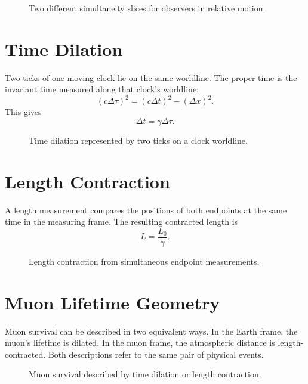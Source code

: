 \begin{figure}[h!]
  \centering
  
  \caption{Two different simultaneity slices for observers in relative motion.}
\end{figure}

\clearpage

\section{Time Dilation}

Two ticks of one moving clock lie on the same worldline.  The proper time is the
invariant time measured along that clock's worldline:
\[
(c\Delta\tau)^2=(c\Delta t)^2-(\Delta x)^2.
\]
This gives
\[
\Delta t=\gamma\Delta\tau.
\]

\begin{figure}[h!]
  \centering
  
  \caption{Time dilation represented by two ticks on a clock worldline.}
\end{figure}

\clearpage

\section{Length Contraction}

A length measurement compares the positions of both endpoints at the same time
in the measuring frame.  The resulting contracted length is
\[
L=\frac{L_0}{\gamma}.
\]

\begin{figure}[h!]
  \centering
  
  \caption{Length contraction from simultaneous endpoint measurements.}
\end{figure}

\clearpage

\section{Muon Lifetime Geometry}

Muon survival can be described in two equivalent ways.  In the Earth frame, the
muon's lifetime is dilated.  In the muon frame, the atmospheric distance is
length-contracted.  Both descriptions refer to the same pair of physical events.

\begin{figure}[h!]
  \centering
  
  \caption{Muon survival described by time dilation or length contraction.}
\end{figure}
